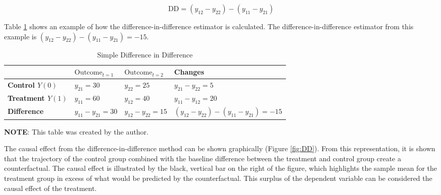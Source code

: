\documentclass[12pt]{article}
\begin{document}
\begin{equation}
  \label{eq:SimpleDD}
  \textrm{DD} = (y_{12} - y_{22}) - (y_{11}-y_{21})
\end{equation}

Table \ref{tab:SimpleDD} shows an example of how the difference-in-difference estimator is calculated. The difference-in-difference estimator from this example is $(y_{12} - y_{22}) - (y_{11}-y_{21}) = -15$.

\begin{table}
  \caption{Simple Difference in Difference}
  \begin{center}
      \begin{threeparttable}
        \begin{tabularx}{\textwidth}{|p{4cm}|p{3cm}|p{3cm}|X|}
        \hline
         & \textbf{$\textrm{Outcome}_{t=1}$} & \textbf{$\textrm{Outcome}_{t=2}$} & \textbf{Changes} \\
        \hline
        \textbf{Control $Y(0)$} & $y_{21}=30$ & $y_{22}=25$ & $y_{21} - y_{22} = 5$ \\
        \hline
        \textbf{Treatment $Y(1)$} & $y_{11}=60$ & $y_{12}=40$ & $y_{11}-y_{12} = 20$\\
        \hline
        \textbf{Difference} & $y_{11}-y_{21} = 30$ & $y_{12} - y_{22} = 15$ & $(y_{12} - y_{22}) - (y_{11}-y_{21}) = -15$ \\
        \hline
      \end{tabularx}
      \begin{tablenotes}
        \footnotesize
        \textbf{NOTE}: This table was created by the author.
      \end{tablenotes}
    \end{threeparttable}
  \end{center}
\label{tab:SimpleDD}
\end{table}

The causal effect from the difference-in-difference method can be shown graphically (Figure \ref{fig:DD}). From this representation, it is shown that the trajectory of the control group combined with the baseline difference between the treatment and control group create a counterfactual. The causal effect is illustrated by the black, vertical bar on the right of the figure, which highlights the sample mean for the treatment group in excess of what would be predicted by the counterfactual. This surplus of the dependent variable can be considered the causal effect of the treatment.
\end{document}
